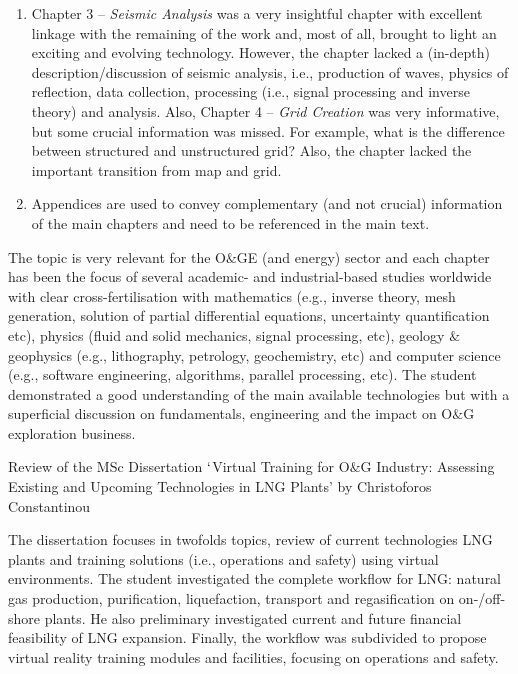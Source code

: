 \documentclass[14pt,twoside]{report}
\begin{document}
\begin{enumerate}
\item Chapter 3 -- {\it Seismic Analysis} was a very insightful chapter with excellent linkage with the remaining of the work and, most of all, brought to light an exciting and evolving technology. However, the chapter lacked a (in-depth) description/discussion of seismic analysis, i.e., production of waves, physics of reflection, data collection, processing (i.e., signal processing and inverse theory) and analysis. Also, Chapter 4 -- {\it Grid Creation} was very informative, but some crucial information was missed. For example, what is the difference between structured and unstructured grid? Also, the chapter lacked the important transition from map and grid. 
\item Appendices are used to convey complementary (and not crucial) information of the main chapters and need to be referenced in the main text.
\end{enumerate}

The topic is very relevant for the O$\&$GE (and energy) sector and each chapter has been the focus of several academic- and industrial-based studies worldwide with clear cross-fertilisation with mathematics (e.g., inverse theory, mesh generation, solution of partial differential equations, uncertainty quantification etc), physics (fluid and solid mechanics, signal processing, etc), geology $\&$ geophysics (e.g., lithography, petrology, geochemistry, etc) and computer science (e.g., software engineering, algorithms, parallel processing, etc). The student demonstrated a good understanding of the main available technologies but with a superficial discussion on fundamentals, engineering and the impact on O$\&$G exploration business.    


\clearpage


\medskip

\begin{center}
{\Large Review of the MSc Dissertation $\lq$Virtual Training for O$\&$G Industry: Assessing Existing and Upcoming Technologies in LNG Plants' by Christoforos Constantinou}
\end{center}

\medskip

The dissertation focuses in twofolds topics, review of current technologies LNG plants and training solutions (i.e., operations and safety) using virtual environments. The student investigated the complete workflow for LNG: natural gas production, purification, liquefaction, transport and regasification on on-/off-shore plants. He also preliminary investigated current and future financial feasibility of LNG expansion. Finally, the workflow was subdivided to propose virtual reality training modules and facilities, focusing on operations and safety.
\end{document}
